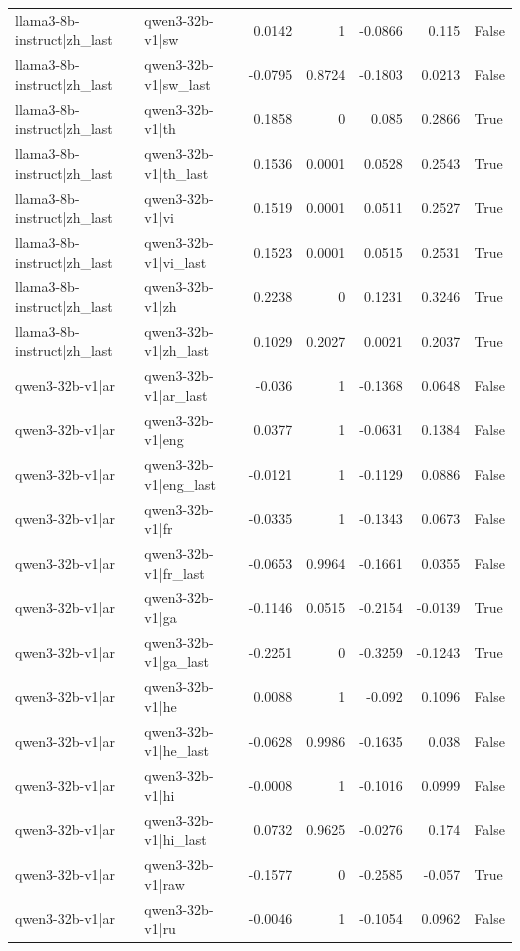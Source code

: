 \begin{table}
\begin{tabular}{l l r r r r l}
llama3-8b-instruct|zh_last & qwen3-32b-v1|sw & 0.0142 & 1 & -0.0866 & 0.115 & False \\
llama3-8b-instruct|zh_last & qwen3-32b-v1|sw_last & -0.0795 & 0.8724 & -0.1803 & 0.0213 & False \\
llama3-8b-instruct|zh_last & qwen3-32b-v1|th & 0.1858 & 0 & 0.085 & 0.2866 & True \\
llama3-8b-instruct|zh_last & qwen3-32b-v1|th_last & 0.1536 & 0.0001 & 0.0528 & 0.2543 & True \\
llama3-8b-instruct|zh_last & qwen3-32b-v1|vi & 0.1519 & 0.0001 & 0.0511 & 0.2527 & True \\
llama3-8b-instruct|zh_last & qwen3-32b-v1|vi_last & 0.1523 & 0.0001 & 0.0515 & 0.2531 & True \\
llama3-8b-instruct|zh_last & qwen3-32b-v1|zh & 0.2238 & 0 & 0.1231 & 0.3246 & True \\
llama3-8b-instruct|zh_last & qwen3-32b-v1|zh_last & 0.1029 & 0.2027 & 0.0021 & 0.2037 & True \\
qwen3-32b-v1|ar & qwen3-32b-v1|ar_last & -0.036 & 1 & -0.1368 & 0.0648 & False \\
qwen3-32b-v1|ar & qwen3-32b-v1|eng & 0.0377 & 1 & -0.0631 & 0.1384 & False \\
qwen3-32b-v1|ar & qwen3-32b-v1|eng_last & -0.0121 & 1 & -0.1129 & 0.0886 & False \\
qwen3-32b-v1|ar & qwen3-32b-v1|fr & -0.0335 & 1 & -0.1343 & 0.0673 & False \\
qwen3-32b-v1|ar & qwen3-32b-v1|fr_last & -0.0653 & 0.9964 & -0.1661 & 0.0355 & False \\
qwen3-32b-v1|ar & qwen3-32b-v1|ga & -0.1146 & 0.0515 & -0.2154 & -0.0139 & True \\
qwen3-32b-v1|ar & qwen3-32b-v1|ga_last & -0.2251 & 0 & -0.3259 & -0.1243 & True \\
qwen3-32b-v1|ar & qwen3-32b-v1|he & 0.0088 & 1 & -0.092 & 0.1096 & False \\
qwen3-32b-v1|ar & qwen3-32b-v1|he_last & -0.0628 & 0.9986 & -0.1635 & 0.038 & False \\
qwen3-32b-v1|ar & qwen3-32b-v1|hi & -0.0008 & 1 & -0.1016 & 0.0999 & False \\
qwen3-32b-v1|ar & qwen3-32b-v1|hi_last & 0.0732 & 0.9625 & -0.0276 & 0.174 & False \\
qwen3-32b-v1|ar & qwen3-32b-v1|raw & -0.1577 & 0 & -0.2585 & -0.057 & True \\
qwen3-32b-v1|ar & qwen3-32b-v1|ru & -0.0046 & 1 & -0.1054 & 0.0962 & False \\

\end{tabular}
\end{table}
